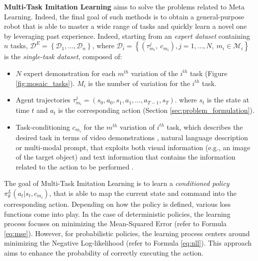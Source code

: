 \textbf{Multi-Task Imitation Learning} aims to solve the problems related to Meta Learning. Indeed, the final goal of such methods is to obtain a general-purpose robot that is able to master a wide range of tasks and quickly learn a novel one by leveraging past experience.
\newline Indeed, starting from an \textit{expert dataset} containing $n$ tasks, $\mathcal{D}^{E}=\left \{\mathcal{D}_{1}, \dots, \mathcal{D}_{n}\right \}$, where $\mathcal{D}_{i} = \left \{ (\tau_{m_{i}}^{j}, \ c_{m_{i}}), j=1,\dots,N, \ m_{i} \in \mathcal{M}_{i}\right \}$ is the \textit{single-task dataset}, composed of:
\begin{itemize}
    \item $N$ expert demonstration for each $m^{th}$ variation of the $i^{th}$ task (Figure \ref{fig:mosaic_tasks}). $M_{i}$ is the number of variation for the $i^{th}$ task.
    \item Agent trajectories $\tau_{m_{i}}^{j} = (s_{0}, a_{0}, s_{1}, a_{1}, \dots, a_{T-1}, s_{T})$. where $s_{t}$ is the state at time $t$ and $a_{t}$ is the corresponding action (Section \ref{sec:problem_formulation}).
    \item Task-conditioning $c_{m_{i}}$ for the $m^{th}$ variation of $i^{th}$ task, which describes the desired task in terms of video demonstrations \cite{james2018task_embedded,bhutani2022attentive_one_shot,dasari2021transformers_one_shot,mandi2022towards_more_generalizable_one_shot}, natural language description \cite{stepputtis2020language,jang2022bc_z,mees2022calvin,doasIcan2022,mees2022hulc,brohan2022rt,shridhar2023perceiver} or multi-modal prompt, that exploits both visual information (e.g., an image of the target object) and text information that contains the information related to the action to be performed \cite{jiang2023vima}.
\end{itemize}
The goal of Multi-Task Imitation Learning is to learn a \textit{conditioned policy} $\pi^{L}_{\theta}(a_{t}|s_{t}, c_{m_{i}})$, that is able to map the current state and command into the corresponding action.
Depending on how the policy is defined, various loss functions come into play. In the case of deterministic policies, the learning process focuses on minimizing the Mean-Squared Error (refer to Formula \ref{eq:mse}). However, for probabilistic policies, the learning process centers around minimizing the Negative Log-likelihood (refer to Formula \ref{eq:nll}). This approach aims to enhance the probability of correctly executing the action.

